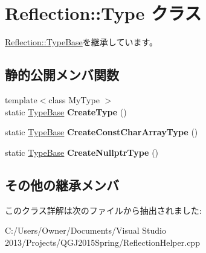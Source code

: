 \hypertarget{class_reflection_1_1_type}{}\section{Reflection\+:\+:Type クラス}
\label{class_reflection_1_1_type}


\hyperlink{class_reflection_1_1_type_base}{Reflection\+::\+Type\+Base}を継承しています。

\subsection*{静的公開メンバ関数}
\begin{DoxyCompactItemize}
\item 
{\footnotesize template$<$class My\+Type $>$ }\\static \hyperlink{class_reflection_1_1_type_base}{Type\+Base} {\bfseries Create\+Type} ()\hypertarget{class_reflection_1_1_type_ae214cc0516613307aac8049b01596ad5}{}\label{class_reflection_1_1_type_ae214cc0516613307aac8049b01596ad5}

\item 
static \hyperlink{class_reflection_1_1_type_base}{Type\+Base} {\bfseries Create\+Const\+Char\+Array\+Type} ()\hypertarget{class_reflection_1_1_type_a53ed334067c2ac282a4b3eb01cddec74}{}\label{class_reflection_1_1_type_a53ed334067c2ac282a4b3eb01cddec74}

\item 
static \hyperlink{class_reflection_1_1_type_base}{Type\+Base} {\bfseries Create\+Nullptr\+Type} ()\hypertarget{class_reflection_1_1_type_aceb6078ac3ab6fe081b1d2a4a2ac00f7}{}\label{class_reflection_1_1_type_aceb6078ac3ab6fe081b1d2a4a2ac00f7}

\end{DoxyCompactItemize}
\subsection*{その他の継承メンバ}


このクラス詳解は次のファイルから抽出されました\+:\begin{DoxyCompactItemize}
\item 
C\+:/\+Users/\+Owner/\+Documents/\+Visual Studio 2013/\+Projects/\+Q\+G\+J2015\+Spring/Reflection\+Helper.\+cpp\end{DoxyCompactItemize}
